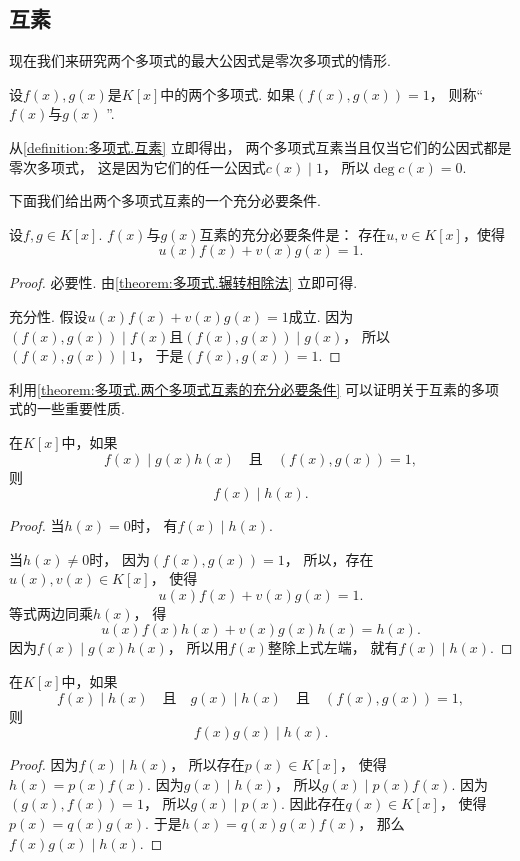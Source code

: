 \subsection{互素}
现在我们来研究两个多项式的最大公因式是零次多项式的情形.

\begin{definition}\label{definition:多项式.互素}
设\(f(x),g(x)\)是\(K[x]\)中的两个多项式.
如果\((f(x),g(x))=1\)，
则称“\(f(x)\)与\(g(x)\) ”.
\end{definition}

从\cref{definition:多项式.互素} 立即得出，
两个多项式互素当且仅当它们的公因式都是零次多项式，
这是因为它们的任一公因式\(c(x) \mid 1\)，
所以\(\deg c(x) = 0\).

下面我们给出两个多项式互素的一个充分必要条件.
\begin{theorem}\label{theorem:多项式.两个多项式互素的充分必要条件}
设\(f,g \in K[x]\).
\(f(x)\)与\(g(x)\)互素的充分必要条件是：
存在\(u,v \in K[x]\)，使得\[
	u(x) f(x) + v(x) g(x) = 1.
\]
\begin{proof}
必要性.
由\cref{theorem:多项式.辗转相除法} 立即可得.

充分性.
假设\(u(x) f(x) + v(x) g(x) = 1\)成立.
因为\((f(x),g(x)) \mid f(x)\)且\((f(x),g(x)) \mid g(x)\)，
所以\((f(x),g(x)) \mid 1\)，
于是\((f(x),g(x)) = 1\).
\end{proof}
\end{theorem}

利用\cref{theorem:多项式.两个多项式互素的充分必要条件} 可以证明关于互素的多项式的一些重要性质.

\begin{property}
在\(K[x]\)中，如果\[
	f(x) \mid g(x) h(x)
	\quad\text{且}\quad
	(f(x),g(x))=1,
\]
则\[
	f(x) \mid h(x).
\]
\begin{proof}
当\(h(x)=0\)时，
有\(f(x) \mid h(x)\).

当\(h(x)\neq0\)时，
因为\((f(x),g(x))=1\)，
所以，存在\(u(x),v(x) \in K[x]\)，
使得\[
	u(x) f(x) + v(x) g(x) = 1.
\]
等式两边同乘\(h(x)\)，
得\[
	u(x) f(x) h(x) + v(x) g(x) h(x) = h(x).
\]
因为\(f(x) \mid g(x) h(x)\)，
所以用\(f(x)\)整除上式左端，
就有\(f(x) \mid h(x)\).
\end{proof}
\end{property}

\begin{property}
在\(K[x]\)中，如果\[
	f(x) \mid h(x)
	\quad\text{且}\quad
	g(x) \mid h(x)
	\quad\text{且}\quad
	(f(x),g(x))=1,
\]
则\[
	f(x) g(x) \mid h(x).
\]
\begin{proof}
因为\(f(x) \mid h(x)\)，
所以存在\(p(x) \in K[x]\)，
使得\(h(x) = p(x) f(x)\).
因为\(g(x) \mid h(x)\)，
所以\(g(x) \mid p(x) f(x)\).
因为\((g(x),f(x))=1\)，
所以\(g(x) \mid p(x)\).
因此存在\(q(x) \in K[x]\)，
使得\(p(x) = q(x) g(x)\).
于是\(h(x) = q(x) g(x) f(x)\)，
那么\(f(x) g(x) \mid h(x)\).
\end{proof}
\end{property}

